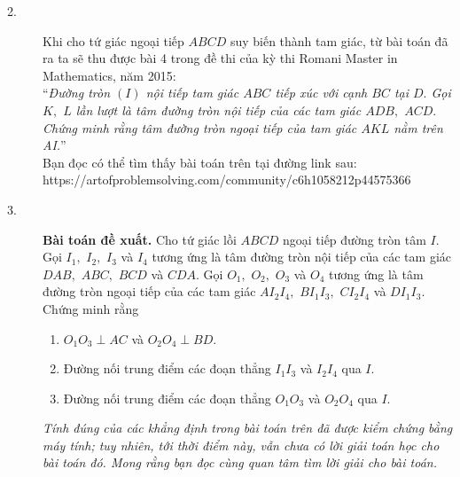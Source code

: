 \begin{bt}
{\begin{nx}
\begin{description}
				\item[2.] Khi cho tứ giác ngoại tiếp $ABCD$ suy biến thành tam giác, từ bài toán đã ra ta sẽ thu được bài 4 trong đề thi của kỳ thi Romani Master in Mathematics, năm 2015:\\
				``\textit{Đường tròn $(I)$ nội tiếp tam giác $ABC$ tiếp xúc với cạnh $BC$ tại $D.$ Gọi $K,$ $L$ lần lượt là tâm đường tròn nội tiếp của các tam giác $ADB,$ $ACD.$ Chứng minh rằng tâm đường tròn ngoại tiếp của tam giác $AKL$ nằm trên AI.}''\\
				Bạn đọc có thể tìm thấy bài toán trên tại đường link sau:\\ https://artofproblemsolving.com/community/c6h1058212p44575366
				\item[3.] \textbf{Bài toán đề xuất.} Cho tứ giác lồi $ABCD$ ngoại tiếp đường tròn tâm $I.$ Gọi $I_1, $ $I_2,$ $I_3$ và $I_4$ tương ứng là tâm đường tròn nội tiếp của các tam giác $DAB,$ $ABC,$ $BCD$ và $CDA.$ Gọi $O_1,$ $O_2,$ $O_3$ và $O_4$ tương ứng là tâm đường tròn ngoại tiếp của các tam giác $AI_2I_4,$ $BI_1I_3,$ $CI_2I_4$ và $DI_1I_3.$ Chứng minh rằng
				\begin{enumerate}
					\item $O_1O_3 \perp AC$ và $O_2O_4 \perp BD.$
					\item Đường nối trung điểm các đoạn thẳng $I_1I_3$ và $I_2I_4$ qua $I.$
					\item Đường nối trung điểm các đoạn thẳng $O_1O_3$ và $O_2O_4$ qua $I.$
				\end{enumerate}
				\textit{Tính đúng của các khẳng định trong bài toán trên đã được kiểm chứng bằng máy tính; tuy nhiên, tới thời điểm này, vẫn chưa có lời giải toán học cho bài toán đó. Mong rằng bạn đọc cùng quan tâm tìm lời giải cho bài toán. }
			\end{description}
		\end{nx}
	}
	
\end{bt}

